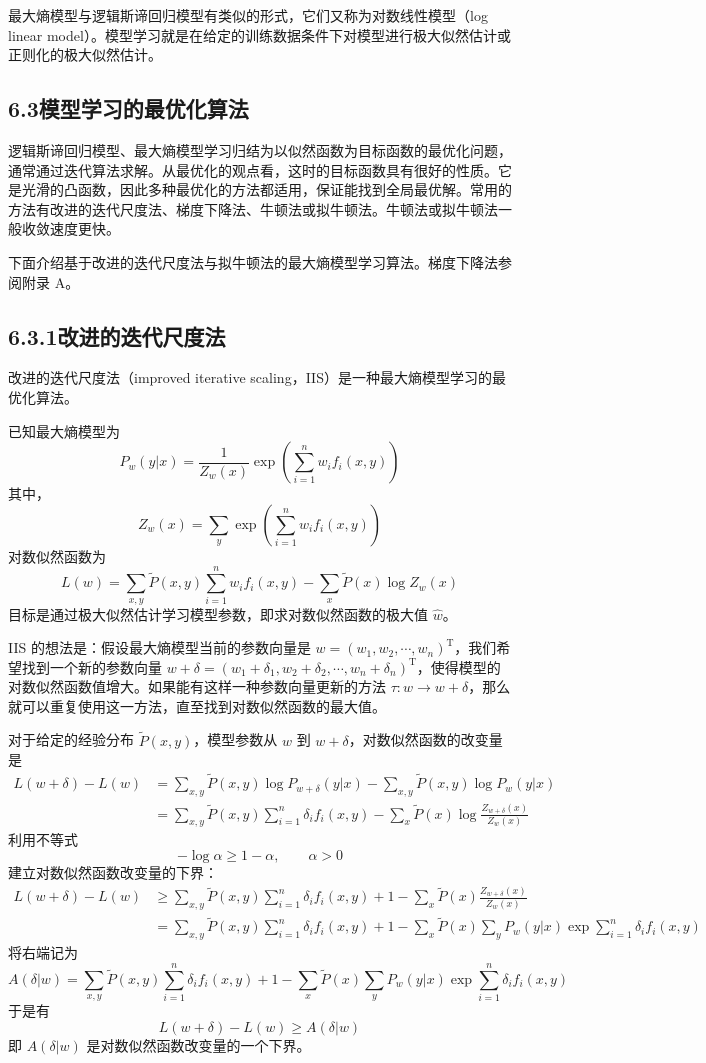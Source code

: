 \documentclass[UTF8, 12pt, fontset=fandol, oneside]{ctexart}
\begin{document}
最大熵模型与逻辑斯谛回归模型有类似的形式，它们又称为对数线性模型（log linear model）。模型学习就是在给定的训练数据条件下对模型进行极大似然估计或正则化的极大似然估计。

\subsection*{6.3\quad 模型学习的最优化算法}

逻辑斯谛回归模型、最大熵模型学习归结为以似然函数为目标函数的最优化问题，通常通过迭代算法求解。从最优化的观点看，这时的目标函数具有很好的性质。它是光滑的凸函数，因此多种最优化的方法都适用，保证能找到全局最优解。常用的方法有改进的迭代尺度法、梯度下降法、牛顿法或拟牛顿法。牛顿法或拟牛顿法一般收敛速度更快。

下面介绍基于改进的迭代尺度法与拟牛顿法的最大熵模型学习算法。梯度下降法参阅附录 A。

\subsection*{6.3.1\quad 改进的迭代尺度法}

改进的迭代尺度法（improved iterative scaling，IIS）是一种最大熵模型学习的最优化算法。

已知最大熵模型为
\[
P_w(y|x)=\frac{1}{Z_w(x)}\exp\left(\sum_{i=1}^n w_i f_i(x,y)\right)
\]
其中，
\[
Z_w(x)=\sum_y\exp\left(\sum_{i=1}^n w_i f_i(x,y)\right)
\]
对数似然函数为
\[
L(w)=\sum_{x,y}\tilde{P}(x,y)\sum_{i=1}^n w_i f_i(x,y)-\sum_x\tilde{P}(x)\log Z_w(x)
\]
目标是通过极大似然估计学习模型参数，即求对数似然函数的极大值 $\hat{w}$。

IIS 的想法是：假设最大熵模型当前的参数向量是 $w=(w_1,w_2,\cdots,w_n)^{\mathrm{T}}$，我们希望找到一个新的参数向量 $w+\delta=(w_1+\delta_1,w_2+\delta_2,\cdots,w_n+\delta_n)^{\mathrm{T}}$，使得模型的对数似然函数值增大。如果能有这样一种参数向量更新的方法 $\tau:w\to w+\delta$，那么就可以重复使用这一方法，直至找到对数似然函数的最大值。

对于给定的经验分布 $\tilde{P}(x,y)$，模型参数从 $w$ 到 $w+\delta$，对数似然函数的改变量是
\[
\begin{aligned}
L(w+\delta)-L(w)
&=\sum_{x,y}\tilde{P}(x,y)\log P_{w+\delta}(y|x)-\sum_{x,y}\tilde{P}(x,y)\log P_w(y|x)\\
&=\sum_{x,y}\tilde{P}(x,y)\sum_{i=1}^n\delta_i f_i(x,y)-\sum_x\tilde{P}(x)\log\frac{Z_{w+\delta}(x)}{Z_w(x)}
\end{aligned}
\]
利用不等式
\[
-\log\alpha\geq 1-\alpha,\qquad \alpha>0
\]
建立对数似然函数改变量的下界：
\[
\begin{aligned}
L(w+\delta)-L(w)
&\geq \sum_{x,y}\tilde{P}(x,y)\sum_{i=1}^n\delta_i f_i(x,y)+1-\sum_x\tilde{P}(x)\frac{Z_{w+\delta}(x)}{Z_w(x)}\\
&=\sum_{x,y}\tilde{P}(x,y)\sum_{i=1}^n\delta_i f_i(x,y)+1
-\sum_x\tilde{P}(x)\sum_y P_w(y|x)\exp\sum_{i=1}^n\delta_i f_i(x,y)
\end{aligned}
\]
将右端记为
\[
A(\delta|w)=\sum_{x,y}\tilde{P}(x,y)\sum_{i=1}^n\delta_i f_i(x,y)+1
-\sum_x\tilde{P}(x)\sum_y P_w(y|x)\exp\sum_{i=1}^n\delta_i f_i(x,y)
\]
于是有
\[
L(w+\delta)-L(w)\geq A(\delta|w)
\]
即 $A(\delta|w)$ 是对数似然函数改变量的一个下界。
\end{document}
